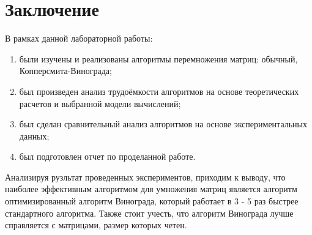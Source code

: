 \chapter*{Заключение}

В рамках данной лабораторной работы:
\begin{enumerate}
	\item были изучены и реализованы алгоритмы перемножения матриц: обычный, Копперсмита-Винограда;
	\item был произведен анализ трудоёмкости алгоритмов на основе теоретических расчетов и выбранной модели вычислений;
	\item был сделан сравнительный анализ алгоритмов на основе экспериментальных данных;
    \item был подготовлен отчет по проделанной работе.
\end{enumerate}

Анализируя рузльтат проведенных экспериментов, приходим к выводу, что наиболее эффективным алгоритмом для умножения матриц является алгоритм оптимизированный алгоритм Винограда, который работает в 3 - 5 раз быстрее стандартного алгоритма. Также стоит учесть, что алгоритм Винограда лучше справляется с матрицами, размер которых четен.